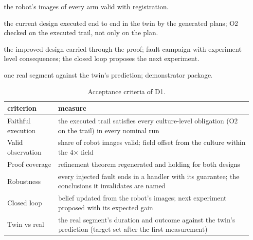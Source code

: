 \documentclass[10.5pt,a4paper]{article}
\begin{document}
\begin{center}\end{center}
\begin{description}[style=nextline]
\item[M1 (week 1)] the robot's images of every arm valid with registration.
\item[M2 (week 3)] the current design executed end to end in the twin by the generated plans; O2 checked on the executed
trail, not only on the plan.
\item[M3 (week 7)] the improved design carried through the proof; fault campaign with experiment-level consequences;
the closed loop proposes the next experiment.
\item[M4 (week 11)] one real segment against the twin's prediction; demonstrator package.
\end{description}

\begin{table}[htbp]\centering\footnotesize\caption{Acceptance criteria of D1.}
\begin{tabularx}{\linewidth}{@{}p{4.2cm}X@{}}\toprule criterion & measure \\\midrule
Faithful execution & the executed trail satisfies every culture-level obligation (O2 on the trail) in every nominal run \\
Valid observation & share of robot images valid; field offset from the culture within the 4$\times$ field \\
Proof coverage & refinement theorem regenerated and holding for both designs \\
Robustness & every injected fault ends in a handler with its guarantee; the conclusions it invalidates are named \\
Closed loop & belief updated from the robot's images; next experiment proposed with its expected gain \\
Twin vs real & the real segment's duration and outcome against the twin's prediction (target set after the first measurement) \\\bottomrule\end{tabularx}\end{table}
\end{document}
